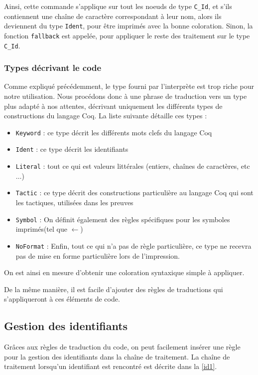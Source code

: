 \documentclass[a4paper, 11pt]{report}
\begin{document}
    Ainsi, cette commande s'applique sur tout les noeuds de type \texttt{C\_Id},
    et s'ils contiennent une chaîne de caractère correspondant à leur nom, alors
    ils deviennent du type \texttt{Ident}, pour être imprimés avec la bonne
    coloration.  Sinon, la fonction \texttt{fallback} est appelée, pour
    appliquer le reste des traitement sur le type \texttt{C\_Id}.
    \subsubsection{Types décrivant le code}
    Comme expliqué précédemment, le type fourni par l'interprète est trop riche
    pour notre utilisation. Nous procédons donc à une phrase de traduction vers
    un type plus adapté à nos attentes, décrivant uniquement les différents types
    de constructions du langage Coq. La liste suivante détaille ces types :
    \begin{itemize}
      \item \texttt{Keyword} : ce type décrit les différents mots clefs du langage Coq
      \item \texttt{Ident} : ce type décrit les identifiants
      \item \texttt{Literal} : tout ce qui est valeurs littérales (entiers, chaînes de
        caractères, etc $\ldots$)
      \item \texttt{Tactic} : ce type décrit des constructions particulière au langage
        Coq qui sont les tactiques, utilisées dans les preuves
      \item \texttt{Symbol} : On définit également des règles spécifiques pour les symboles
        imprimés(tel que $\leftarrow$)
      \item \texttt{NoFormat} : Enfin, tout ce qui n'a pas de règle particulière, ce type
        ne recevra pas de mise en forme particulière lors de l'impression.
    \end{itemize}
    On est ainsi en mesure d'obtenir une coloration syntaxique simple à
    appliquer.

    De la même manière, il est facile d'ajouter des règles de traductions
    qui s'appliqueront à ces éléments de code.

    \subsection{Gestion des identifiants}
    Grâces aux règles de traduction du code, on peut facilement insérer une
    règle pour la gestion des identifiants dans la chaîne de traitement.
    La chaîne de traitement lorsqu'un identifiant est rencontré est décrite
    dans la \cref{id1}.
\end{document}
